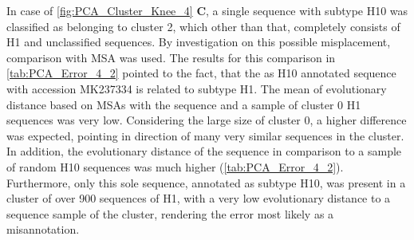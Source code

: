 \begin{table}[!hbt]
    \centering
    \caption[Anomalies in segment 4 cluster 48 with PK]{\textbf{Anomalies in segment 4 cluster 48 with PK.} The \glspl{MSA} mean distance of the given sequences in comparison to a sample of H16 sequences of the same cluster and a sample of H13 sequences from other clusters was calculated. Only the first 20 columns are presented, the full table can be found in the projects GitHub Repository\footnotemark.}
    \label{tab:PCA_Error_4_48}
\end{table}

\vspace{1em}

In case of \autoref{fig:PCA_Cluster_Knee_4} \textbf{\textsf{C}}, a single sequence with subtype H10 was classified as belonging to cluster 2, which other than that, completely consists of H1 and unclassified sequences. By investigation on this possible misplacement, comparison with \gls{MSA} was used. The results for this comparison in \autoref{tab:PCA_Error_4_2} pointed to the fact, that the as H10 annotated sequence with accession MK237334 is related to subtype H1. The mean of evolutionary distance based on \glspl{MSA} with the sequence and a sample of cluster 0 H1 sequences was very low. Considering the large size of cluster 0, a higher difference was expected, pointing in direction of many very similar sequences in the cluster. In addition, the evolutionary distance of the sequence in comparison to a sample of random H10 sequences was much higher (\autoref{tab:PCA_Error_4_2}). Furthermore, only this sole sequence, annotated as subtype H10, was present in a cluster of over 900 sequences of H1, with a very low evolutionary distance to a sequence sample of the cluster, rendering the error most likely as a misannotation.


